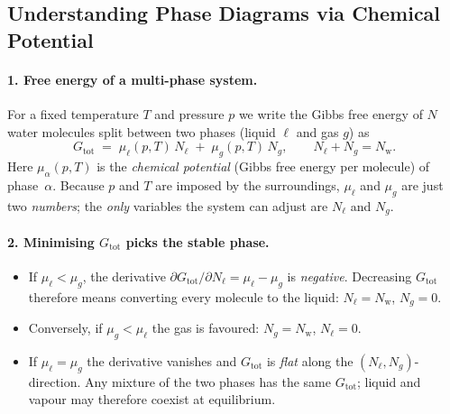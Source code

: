 \documentclass[12pt]{article}
\title{}
\author{Jerich Lee}
\date{\today}
\theoremstyle{definition} %
\theoremstyle{plain} %
\begin{document}
\maketitle

\subsection*{Understanding Phase Diagrams via Chemical Potential}

\paragraph{1.  Free energy of a multi-phase system.}
For a fixed temperature \(T\) and pressure \(p\) we write the Gibbs free
energy of \(N\) water molecules split between two phases
(liquid \(\ell\) and gas \(g\)) as
\[
  G_{\mathrm{tot}}
  \;=\;
  \mu_{\ell}(p,T)\,N_{\ell} \;+\; \mu_{g}(p,T)\,N_{g},
  \qquad
  N_{\ell}+N_{g}=N_{\mathrm{w}} .
\]
Here \(\mu_{\alpha}(p,T)\) is the \emph{chemical potential}
(Gibbs free energy per molecule) of phase~\(\alpha\).
Because \(p\) and \(T\) are imposed by the surroundings,
\(\mu_{\ell}\) and \(\mu_{g}\) are just two \emph{numbers};
the \emph{only} variables the system can adjust are
\(N_{\ell}\) and \(N_{g}\).

\paragraph{2.  Minimising \(G_{\mathrm{tot}}\) picks the stable phase.}
\begin{itemize}
  \item If \(\mu_{\ell} < \mu_{g}\), the derivative
        \(\partial G_{\mathrm{tot}}/\partial N_{\ell} = \mu_{\ell}-\mu_{g}\)
        is \emph{negative}.  Decreasing \(G_{\mathrm{tot}}\)
        therefore means converting every molecule to the liquid:
        \(N_{\ell}=N_{\mathrm{w}}\), \(N_{g}=0\).
  \item Conversely, if \(\mu_{g} < \mu_{\ell}\) the gas is favoured:
        \(N_{g}=N_{\mathrm{w}}\), \(N_{\ell}=0\).
  \item If \(\mu_{\ell} = \mu_{g}\) the derivative vanishes and
        \(G_{\mathrm{tot}}\) is \emph{flat} along the
        \((N_{\ell},N_{g})\)-direction.  Any mixture of the two phases
        has the same \(G_{\mathrm{tot}}\);
        liquid and vapour may therefore coexist at equilibrium.
\end{itemize}
\end{document}
